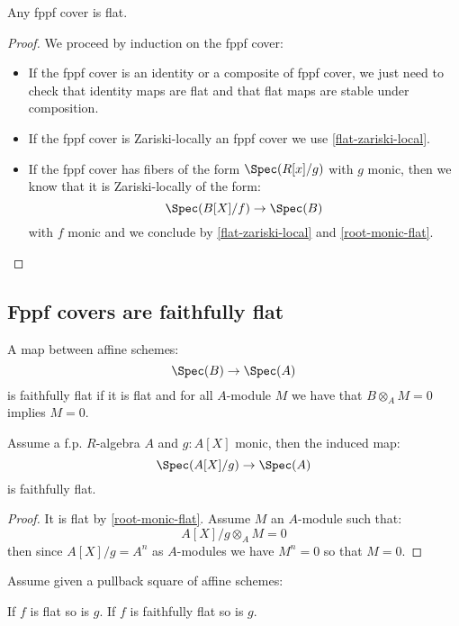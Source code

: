 \begin{lemma}\label{cover-is-flat}
Any fppf cover is flat.
\end{lemma}

\begin{proof}
We proceed by induction on the fppf cover:
\begin{itemize}
\item If the fppf cover is an identity or a composite of fppf cover, we just need to check that identity maps are flat and that flat maps are stable under composition.
\item If the fppf cover is Zariski-locally an fppf cover we use \cref{flat-zariski-local}.
\item If the fppf cover has fibers of the form $\Spec(R[x]/g)$ with $g$ monic, then we know that it is Zariski-locally of the form:
\[\Spec(B[X]/f)\to \Spec(B)\]
with $f$ monic and we conclude by \cref{flat-zariski-local} and \cref{root-monic-flat}.
\end{itemize}
\end{proof}

\subsection{Fppf covers are faithfully flat}

\begin{definition}
A map between affine schemes:
\[\Spec(B)\to \Spec(A)\]
is faithfully flat if it is flat and for all $A$-module $M$ we have that $B\otimes_AM = 0$ implies $M=0$.
\end{definition}

\begin{lemma}\label{root-monic-faithfully-flat}
Assume a f.p. $R$-algebra $A$ and $g:A[X]$ monic, then the induced map:
\[\Spec(A[X]/g)\to \Spec(A)\]
is faithfully flat.
\end{lemma}

\begin{proof}
It is flat by \cref{root-monic-flat}. Assume $M$ an $A$-module such that:
\[ A[X]/g\otimes_AM = 0\]
then since $A[X]/g = A^n$ as $A$-modules we have $M^n = 0$ so that $M=0$.
\end{proof}

\begin{lemma}\label{pullback-faitfully-flat}
Assume given a pullback square of affine schemes:
 \begin{center}
    \end{center}
If $f$ is flat so is $g$. If $f$ is faithfully flat so is $g$.
\end{lemma}

